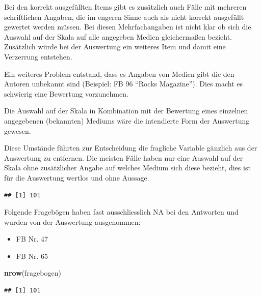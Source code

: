 \documentclass[]{article}
\newenvironment{Shaded}{\begin{snugshade}}{\end{snugshade}}
\newcommand{\KeywordTok}[1]{\textcolor[rgb]{0.13,0.29,0.53}{\textbf{{#1}}}}
\newcommand{\StringTok}[1]{\textcolor[rgb]{0.31,0.60,0.02}{{#1}}}
\newcommand{\OtherTok}[1]{\textcolor[rgb]{0.56,0.35,0.01}{{#1}}}
\newcommand{\NormalTok}[1]{{#1}}
\providecommand{\tightlist}{%
  \setlength{\itemsep}{0pt}\setlength{\parskip}{0pt}}
\begin{document}
Bei den korrekt ausgefüllten Items gibt es zusätzlich auch Fälle mit
mehreren schriftlichen Angaben, die im engeren Sinne auch als nicht
korrekt ausgefüllt gewertet werden müssen. Bei diesen Mehrfachangaben
ist nicht klar ob sich die Auswahl auf der Skala auf alle angegeben
Medien gleichermaßen bezieht. Zusätzlich würde bei der Auswertung ein
weiteres Item und damit eine Verzerrung entstehen.

Ein weiteres Problem entstand, dass es Angaben von Medien gibt die den
Autoren unbekannt sind (Beispiel: FB 96 ``Rocks Magazine''). Dies macht
es schwierig eine Bewertung vorzunehmen.

Die Auswahl auf der Skala in Kombination mit der Bewertung eines
einzelnen angegebenen (bekannten) Mediums wäre die intendierte Form der
Auswertung gewesen.

Diese Umstände führten zur Entscheidung die fragliche Variable gänzlich
aus der Auswertung zu entfernen. Die meisten Fälle haben nur eine
Auswahl auf der Skala ohne zusätzlicher Angabe auf welches Medium sich
diese bezieht, dies ist für die Auswertung wertlos und ohne Aussage.

\begin{Shaded}
\end{Shaded}

\begin{verbatim}
## [1] 101
\end{verbatim}

Folgende Fragebögen haben fast ausschliesslich NA bei den Antworten und
wurden von der Auswertung ausgenommen:

\begin{itemize}
\tightlist
\item
  FB Nr. 47
\item
  FB Nr. 65
\end{itemize}

\begin{Shaded}
\begin{Highlighting}[]
\KeywordTok{nrow}\NormalTok{(fragebogen)}
\end{Highlighting}
\end{Shaded}

\begin{verbatim}
## [1] 101
\end{verbatim}
\end{document}
